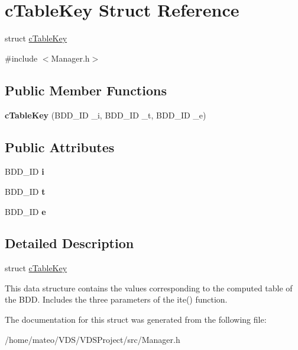 \hypertarget{structcTableKey}{}\section{c\+Table\+Key Struct Reference}
\label{structcTableKey}


struct \hyperlink{structcTableKey}{c\+Table\+Key}  




{\ttfamily \#include $<$Manager.\+h$>$}

\subsection*{Public Member Functions}
\begin{DoxyCompactItemize}
\item 
\mbox{\label{structcTableKey_aa67f600141ab3859ff7fbf02eed380fe}} 
{\bfseries c\+Table\+Key} (B\+D\+D\+\_\+\+ID \+\_\+i, B\+D\+D\+\_\+\+ID \+\_\+t, B\+D\+D\+\_\+\+ID \+\_\+e)
\end{DoxyCompactItemize}
\subsection*{Public Attributes}
\begin{DoxyCompactItemize}
\item 
\mbox{\label{structcTableKey_a03124f772d9f7adbb18d8c1b1c438663}} 
B\+D\+D\+\_\+\+ID {\bfseries i}
\item 
\mbox{\label{structcTableKey_a15f7238635aad27f28908f44a3bd7828}} 
B\+D\+D\+\_\+\+ID {\bfseries t}
\item 
\mbox{\label{structcTableKey_a46d4e6df73e9a82776c52db372529b48}} 
B\+D\+D\+\_\+\+ID {\bfseries e}
\end{DoxyCompactItemize}


\subsection{Detailed Description}
struct \hyperlink{structcTableKey}{c\+Table\+Key} 

This data structure contains the values corresponding to the computed table of the B\+DD. Includes the three parameters of the ite() function. 

The documentation for this struct was generated from the following file\+:\begin{DoxyCompactItemize}
\item 
/home/mateo/\+V\+D\+S/\+V\+D\+S\+Project/src/Manager.\+h\end{DoxyCompactItemize}
